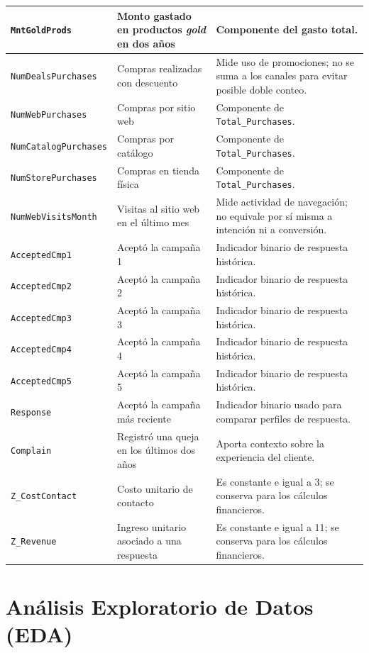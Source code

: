 \documentclass[12pt]{article}
\begin{document}
\begin{longtable}{|p{3.1cm}|p{4.6cm}|p{6.2cm}|}
\hline
\texttt{MntGoldProds} & Monto gastado en productos \textit{gold} en dos años & Componente del gasto total. \\
\hline
\texttt{NumDealsPurchases} & Compras realizadas con descuento & Mide uso de promociones; no se suma a los canales para evitar posible doble conteo. \\
\hline
\texttt{NumWebPurchases} & Compras por sitio web & Componente de \texttt{Total\_Purchases}. \\
\hline
\texttt{NumCatalogPurchases} & Compras por catálogo & Componente de \texttt{Total\_Purchases}. \\
\hline
\texttt{NumStorePurchases} & Compras en tienda física & Componente de \texttt{Total\_Purchases}. \\
\hline
\texttt{NumWebVisitsMonth} & Visitas al sitio web en el último mes & Mide actividad de navegación; no equivale por sí misma a intención ni a conversión. \\
\hline
\texttt{AcceptedCmp1} & Aceptó la campaña 1 & Indicador binario de respuesta histórica. \\
\hline
\texttt{AcceptedCmp2} & Aceptó la campaña 2 & Indicador binario de respuesta histórica. \\
\hline
\texttt{AcceptedCmp3} & Aceptó la campaña 3 & Indicador binario de respuesta histórica. \\
\hline
\texttt{AcceptedCmp4} & Aceptó la campaña 4 & Indicador binario de respuesta histórica. \\
\hline
\texttt{AcceptedCmp5} & Aceptó la campaña 5 & Indicador binario de respuesta histórica. \\
\hline
\texttt{Response} & Aceptó la campaña más reciente & Indicador binario usado para comparar perfiles de respuesta. \\
\hline
\texttt{Complain} & Registró una queja en los últimos dos años & Aporta contexto sobre la experiencia del cliente. \\
\hline
\texttt{Z\_CostContact} & Costo unitario de contacto & Es constante e igual a 3; se conserva para los cálculos financieros. \\
\hline
\texttt{Z\_Revenue} & Ingreso unitario asociado a una respuesta & Es constante e igual a 11; se conserva para los cálculos financieros. \\
\hline
\end{longtable}
\normalsize

\newpage

\section*{Análisis Exploratorio de Datos (EDA)}
\end{document}
